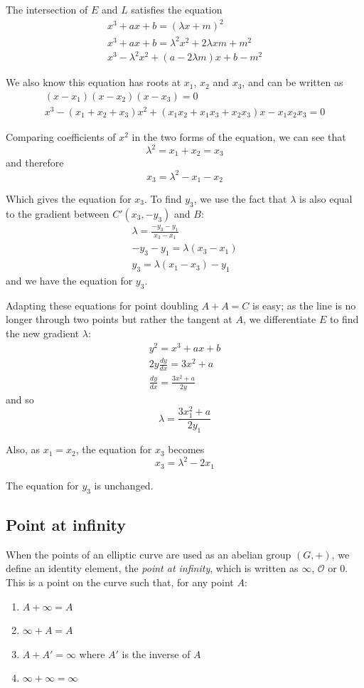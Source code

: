 \documentclass[a4paper]{article}
\begin{document}
The intersection of $E$ and $L$ satisfies the equation
\begin{align*}
    x^3 + ax + b = (\lambda x + m)^2 \\
    x^3 + ax + b = \lambda^2 x^2 + 2 \lambda x m + m^2 \\
    x^3 - \lambda^2 x^2 + (a - 2 \lambda m)x + b - m^2
\end{align*}

We also know this equation has roots at $x_1$, $x_2$ and $x_3$, and can be written as
\begin{align*}
    (x-x_1)(x-x_2)(x-x_3)=0 \\
    x^3 - (x_1 + x_2 + x_3)x^2 + (x_1x_2 + x_1x_3 + x_2x_3)x - x_1x_2x_3 = 0
\end{align*}

Comparing coefficients of $x^2$ in the two forms of the equation, we can see that \[\lambda^2 = x_1 + x_2 = x_3\] and therefore \[x_3 = \lambda^2 - x_1 - x_2\]

Which gives the equation for $x_3$. To find $y_3$, we use the fact that $\lambda$ is also equal to the gradient between $C'(x_3, -y_3)$ and $B$:
\begin{align*}
    \lambda = \frac{-y_3-y_1}{x_3-x_1} \\
    -y_3 - y_1 = \lambda(x_3-x_1) \\
    y_3 = \lambda(x_1-x_3)-y_1
\end{align*}
and we have the equation for $y_3$.\cite{proof}

Adapting these equations for point doubling $A + A = C$ is easy; as the line is no longer through two points but rather the tangent at $A$, we differentiate $E$ to find the new gradient $\lambda$:
\begin{align*}
    y^2 = x^3 + ax + b \\
    2y\frac{dy}{dx} = 3x^2 + a \\
    \frac{dy}{dx} = \frac{3x^2 + a}{2y}
\end{align*}
and so \[\lambda = \frac{3x_1^2 + a}{2y_1}\]

Also, as $x_1 = x_2$, the equation for $x_3$ becomes \[x_3 = \lambda^2-2x_1\]

The equation for $y_3$ is unchanged.

\subsection{Point at infinity}

When the points of an elliptic curve are used as an abelian group $(G, +)$, we define an identity element, the \textit{point at infinity}, which is written as $\infty$, $\mathcal{O}$ or $0$. This is a point on the curve such that, for any point $A$:
\begin{enumerate}
    \item $A + \infty = A$
    \item $\infty + A = A$
    \item $A + A' = \infty$ where $A'$ is the inverse of $A$
    \item $\infty + \infty = \infty$
\end{enumerate}
\end{document}

